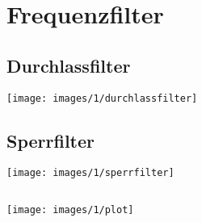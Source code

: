 \section{Frequenzfilter}
\subsection*{Durchlassfilter}
\begin{frame}
	\texttt{[image: images/1/durchlassfilter]}
\end{frame}
\subsection*{Sperrfilter}
\begin{frame}
	\texttt{[image: images/1/sperrfilter]}
\end{frame}
\subsection*{}
\begin{frame}
	\texttt{[image: images/1/plot]}
\end{frame}